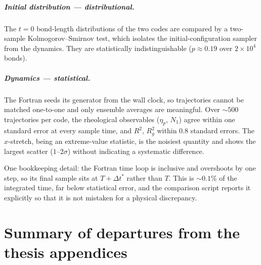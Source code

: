 \documentclass[11pt,a4paper]{report}
\newcommand{\dt}{\Delta t^{*}}
\begin{document}
\paragraph{Initial distribution --- distributional.} The $t=0$ bond-length
distributions of the two codes are compared by a two-sample
Kolmogorov--Smirnov test, which isolates the initial-configuration sampler from
the dynamics. They are statistically indistinguishable ($p\approx0.19$ over
$2\times10^{4}$ bonds).

\paragraph{Dynamics --- statistical.} The Fortran seeds its generator from the
wall clock, so trajectories cannot be matched one-to-one and only ensemble
averages are meaningful. Over $\sim500$ trajectories per code, the rheological
observables ($\eta_p$, $N_1$) agree within one standard error at every sample
time, and $R^{2}$, $R_g^{2}$ within $0.8$ standard errors. The $x$-stretch, being
an extreme-value statistic, is the noisiest quantity and shows the largest
scatter ($1$--$2\sigma$) without indicating a systematic difference.

One bookkeeping detail: the Fortran time loop is inclusive and overshoots by one
step, so its final sample sits at $T+\dt$ rather than $T$. This is $\sim0.1\%$ of
the integrated time, far below statistical error, and the comparison script
reports it explicitly so that it is not mistaken for a physical discrepancy.

\chapter{Summary of departures from the thesis appendices}
\label{sec:departures}
\end{document}
